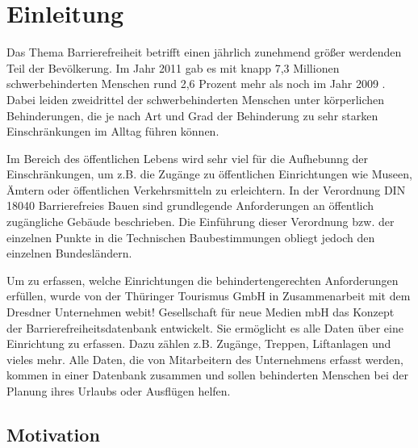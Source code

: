 %
\chapter{Einleitung}
\label{sec:Einleitung}


Das Thema Barrierefreiheit betrifft einen jährlich zunehmend größer werdenden Teil der Bevölkerung. Im Jahr 2011 gab es mit knapp 7,3 Millionen schwerbehinderten Menschen rund 2,6 Prozent mehr als noch im Jahr 2009 \cite[]{WEB:DESTATIS:2014}. Dabei leiden zweidrittel der schwerbehinderten Menschen unter körperlichen Behinderungen, die je nach Art und Grad der Behinderung zu sehr starken Einschränkungen im Alltag führen können.

Im Bereich des öffentlichen Lebens wird sehr viel für die Aufhebunng der Einschränkungen, um z.B. die Zugänge zu öffentlichen Einrichtungen wie Museen, Ämtern oder öffentlichen Verkehrsmitteln zu erleichtern. In der Verordnung DIN 18040 \cite[]{WEB:DIN18040:2010} Barrierefreies Bauen sind grundlegende Anforderungen an öffentlich zugängliche Gebäude beschrieben. Die Einführung dieser Verordnung bzw. der einzelnen Punkte in die Technischen Baubestimmungen obliegt jedoch den einzelnen Bundesländern.

Um zu erfassen, welche Einrichtungen die behindertengerechten Anforderungen erfüllen, wurde von der Thüringer Tourismus GmbH in Zusammenarbeit mit dem Dresdner Unternehmen webit! Gesellschaft für neue Medien mbH das Konzept der Barrierefreiheitsdatenbank entwickelt. Sie ermöglicht es alle Daten über eine Einrichtung zu erfassen. Dazu zählen z.B. Zugänge, Treppen, Liftanlagen und vieles mehr. Alle Daten, die von Mitarbeitern des Unternehmens erfasst werden, kommen in einer Datenbank zusammen und sollen behinderten Menschen bei der Planung ihres Urlaubs oder Ausflügen helfen.

\section{Motivation}
\label{sec:motivation:mot}

